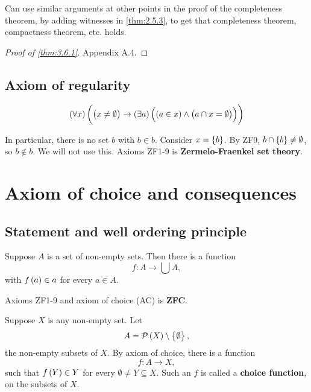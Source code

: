 
\begin{remark}
Can use similar arguments at other points in the proof of the completeness theorem, by adding witnesses in \ref{thm:2.5.3}, to get that completeness theorem, compactness theorem, etc. holds.
\end{remark}

\begin{proof}[Proof of \ref{thm:3.6.1}]
Appendix A.4.
\end{proof}

\subsection{Axiom of regularity}

\begin{axiom}
$$ \fab{x}\impb{\neb{x}{\emptyset}}{\teb{a}\andb{\inb{a}{x}}{\eqb{a \cap x}{\emptyset}}} $$
\end{axiom}

In particular, there is no set $ b $ with $ b \in b $. Consider $ x = \cbr{b} $. By ZF9, $ b \cap \cbr{b} \ne \emptyset $, so $ b \notin b $. We will not use this. Axioms ZF1-9 is \textbf{Zermelo-Fraenkel set theory}.

\pagebreak

\section{Axiom of choice and consequences}

\subsection{Statement and well ordering principle}

\begin{definition}
Suppose $ A $ is a set of non-empty sets. Then there is a function
$$ f : A \to \bigcup A, $$
with $ f\br{a} \in a $ for every $ a \in A $.
\end{definition}

Axioms ZF1-9 and axiom of choice (AC) is \textbf{ZFC}.

\begin{example}
Suppose $ X $ is any non-empty set. Let
$$ A = \PP\br{X} \setminus \cbr{\emptyset}, $$
the non-empty subsets of $ X $. By axiom of choice, there is a function
$$ f : A \to X, $$
such that $ f\br{Y} \in Y $ for every $ \emptyset \ne Y \subseteq X $. Such an $ f $ is called a \textbf{choice function}, on the subsets of $ X $.
\end{example}

